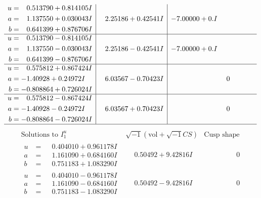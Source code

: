 \documentclass[1p]{elsarticle_modified}
\theoremstyle{definition}
\newcommand{\I}{\sqrt{-1}}
\begin{document}
$$\begin{array}{c|c|c}
\begin{aligned}
u &= \phantom{-}0.513790 + 0.814105 I \\
a &= \phantom{-}1.137550 + 0.030043 I \\
b &= \phantom{-}0.641399 + 0.876706 I\end{aligned}
 & \phantom{-}2.25186 + 0.42541 I & -7.00000 + 0. I\phantom{ +0.000000I} \\ \hline\begin{aligned}
u &= \phantom{-}0.513790 - 0.814105 I \\
a &= \phantom{-}1.137550 - 0.030043 I \\
b &= \phantom{-}0.641399 - 0.876706 I\end{aligned}
 & \phantom{-}2.25186 - 0.42541 I & -7.00000 + 0. I\phantom{ +0.000000I} \\ \hline\begin{aligned}
u &= \phantom{-}0.575812 + 0.867424 I \\
a &= -1.40928 + 0.24972 I \\
b &= -0.808864 + 0.726024 I\end{aligned}
 & \phantom{-}6.03567 - 0.70423 I & \phantom{-0.000000 } 0 \\ \hline\begin{aligned}
u &= \phantom{-}0.575812 - 0.867424 I \\
a &= -1.40928 - 0.24972 I \\
b &= -0.808864 - 0.726024 I\end{aligned}
 & \phantom{-}6.03567 + 0.70423 I & \phantom{-0.000000 } 0\\
 \hline 
 \end{array}$$\newpage$$\begin{array}{c|c|c}  
\text{Solutions to }I^u_{1}& \I (\text{vol} + \sqrt{-1}CS) & \text{Cusp shape}\\
 \hline 
\begin{aligned}
u &= \phantom{-}0.404010 + 0.961178 I \\
a &= \phantom{-}1.161090 + 0.684160 I \\
b &= \phantom{-}0.751183 + 1.083290 I\end{aligned}
 & \phantom{-}0.50492 + 9.42816 I & \phantom{-0.000000 } 0 \\ \hline\begin{aligned}
u &= \phantom{-}0.404010 - 0.961178 I \\
a &= \phantom{-}1.161090 - 0.684160 I \\
b &= \phantom{-}0.751183 - 1.083290 I\end{aligned}
 & \phantom{-}0.50492 - 9.42816 I & \phantom{-0.000000 } 0 \\ \hline\begin{aligned}

\end{aligned}
\end{array}$$
\end{document}

